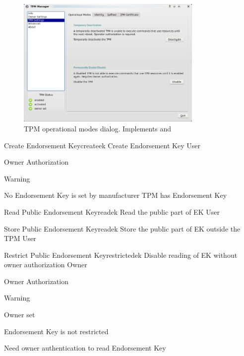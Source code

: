 \documentclass[
  american        %
]{sirrixreport}
\begin{document}
\begin{figure}[h]
 \centering
 \includegraphics[width=0.8\textwidth]{images/uc100110.jpg}
 \caption{TPM operational modes dialog. Implements  and }
\end{figure}
\clearpage


\begin{usecase}{Create Endorsement Key}{createek}
\ucdesc Create Endorsement Key
\ucactors  User
\ucinclude 
   \begin{compactitem}
      \item Owner Authorization 
      \item Warning 
   \end{compactitem}
\ucprecond No Endorsement Key is set by manufacturer
\ucpostcond TPM has Endorsement Key
\end{usecase}


\begin{usecase}{Read Public Endorsement Key}{readek}
\uctitle Read the public part of EK
\ucactors  User
\end{usecase}

\begin{usecase}{Store Public Endorsement Key}{readek}
\uctitle Store the public part of EK outside the TPM
\ucactors  User
\end{usecase}

\begin{usecase}{Restrict Public Endorsement Key}{restrictedek}
\ucdesc Disable reading of EK without owner authorization
\ucactors  Owner
\ucinclude
  \begin{compactitem}
      \item Owner Authorization 
      \item Warning 
   \end{compactitem}
\ucprecond 
   \begin{compactitem}
      \item Owner set
      \item Endorsement Key is not restricted
   \end{compactitem}
\ucpostcond Need owner authentication to read Endorsement Key
\end{usecase}
\clearpage
\end{document}
